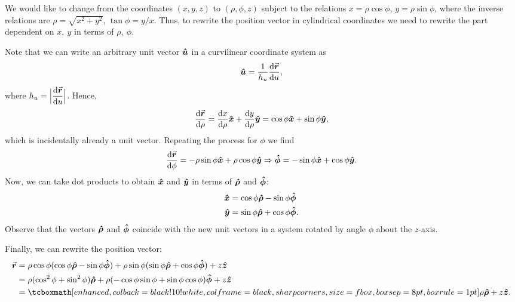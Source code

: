 \def\duedate{09/28/22}
\def\HWnum{2}



    

We would like to change from the coordinates $(x,y,z)$ to $(\rho,\phi,z)$ subject to the relations $x = \rho \cos{\phi}$, $y = \rho \sin{\phi}$, where the inverse relations are $\rho = \sqrt{x^2 + y^2}$, $\tan{\phi} = y/x$.
Thus, to rewrite the position vector in cylindrical coordinates we need to rewrite the part dependent on $x,~y$ in terms of $\rho,~\phi$.

Note that we can write an arbitrary unit vector $\vu*{u}$ in a curvilinear coordinate system as 
\begin{eqnarray}
    \label{eq:arbitrary-unit-vec}
    \vu*{u} = \frac{1}{h_{u}}\dv{\va*{r}}{u} 
,\end{eqnarray}
where $\displaystyle h_{u} = \Big|\dv{\va*{r}}{u}\Big|$.
Hence, 
\begin{eqnarray}
    \label{eq:rho-hat}
    \dv{\va*{r}}{\rho} = \dv{x}{\rho} \vu*{x} + \dv{y}{\rho} \vu*{y} = \cos{\phi} \vu*{x} + \sin{\phi} \vu*{y}
,\end{eqnarray}
which is incidentally already a unit vector.
Repeating the process for $\phi$ we find
\begin{eqnarray}
    \label{eq:phi-hat}
    \dv{\va*{r}}{\phi} = -\rho \sin{\phi} \vu*{x} + \rho \cos{\phi} \vu*{y} \Rightarrow \vu*{\phi} = -\sin{\phi} \vu*{x} + \cos{\phi} \vu*{y}
.\end{eqnarray}
Now, we can take dot products to obtain $\vu*{x}$ and $\vu*{y}$ in terms of $\vu*{\rho}$ and $\vu*{\phi}$:
\begin{align}
    \label{eq:xy-in-rho_phi}
    \vu*{x} &= \cos{\phi} \vu*{\rho} - \sin{\phi} \vu*{\phi} \\
    \vu*{y} &= \sin{\phi} \vu*{\rho} + \cos{\phi} \vu*{\phi}
.\end{align}
Observe that the vectors $\vu*{\rho}$ and $\vu*{\phi}$ coincide with the new unit vectors in a system rotated by angle $\phi$ about the $z$-axis.

Finally, we can rewrite the position vector:
\begin{align}
    \label{eq:rewrite-rvec}
    \va*{r} &= \rho \cos{\phi} (\cos{\phi} \vu*{\rho} - \sin{\phi} \vu*{\phi}) + \rho \sin{\phi} (\sin{\phi} \vu*{\rho} + \cos{\phi} \vu*{\phi}) + z \vu*{z} \notag \\
    &= \rho (\cos^2{\phi} + \sin^2{\phi}) \vu*{\rho} + \rho(-\cos{\phi}\sin{\phi} + \sin{\phi}\cos{\phi}) \vu*{\phi} + z \vu*{z} \notag \\
    &= \eqbox{\rho \vu*{\rho} + z \vu*{z}}
.\end{align}






